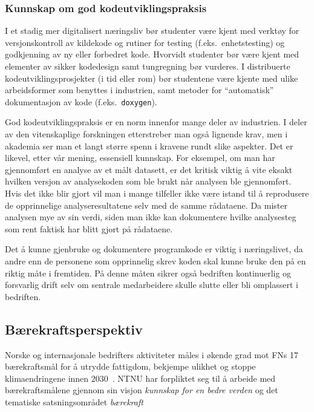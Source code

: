 \documentclass{article}
\begin{document}
\subsubsection{Kunnskap om god kodeutviklingspraksis}
I et stadig mer digitalisert næringsliv bør studenter være kjent med verktøy for versjonskontroll av kildekode og rutiner for testing (f.eks.~enhetstesting) og godkjenning av ny eller forbedret kode. Hvorvidt studenter bør være kjent med elementer av sikker kodedesign samt tungregning bør vurderes. I distribuerte kodeutviklingsprosjekter (i tid eller rom) bør studentene være kjente med ulike  arbeidsformer som benyttes i industrien, samt metoder for ``automatisk'' dokumentasjon av kode (f.eks.~\verb+doxygen+).

God kodeutviklingspraksis er en norm innenfor mange deler av industrien. I deler av den vitenskaplige forskningen etterstreber man også lignende krav, men i akademia ser man et langt større spenn i kravene rundt slike aspekter. Det er likevel, etter vår mening, essensiell kunnskap. For eksempel, om man har gjennomført en analyse av et målt datasett, er det kritisk viktig å vite eksakt hvilken versjon av analysekoden som ble brukt når analysen ble gjennomført. Hvis det ikke blir gjort vil man i mange tilfeller ikke være istand til å reprodusere de opprinnelige analyseresultatene selv med de samme rådataene. Da mister analysen mye av sin verdi, siden man ikke kan dokumentere hvilke analysesteg som rent faktisk har blitt gjort på rådataene.

Det å kunne gjenbruke og dokumentere programkode er viktig i næringslivet, da andre enn de personene som opprinnelig skrev koden skal kunne bruke den på en riktig måte i fremtiden. På denne måten sikrer også bedriften kontinuerlig og forsvarlig drift selv om sentrale medarbeidere skulle slutte eller bli omplassert i bedriften.

\subsection{Bærekraftsperspektiv}
\label{sec:behov-bkraft}
Norske og internasjonale bedrifters aktiviteter måles i økende grad mot FNs 17 bærekraftsmål for å utrydde fattigdom, bekjempe ulikhet og stoppe klimaendringene innen 2030~\cite{FNsustgoals}.
NTNU har forpliktet seg til å arbeide med bærekraftsmålene gjennom sin visjon \emph{kunnskap for en bedre verden} og det tematiske satsningsområdet \emph{bærekraft}~\cite{NTNUStrategi,NTNUBaerekraftMaal,NTNUBaerekraft}
\end{document}
